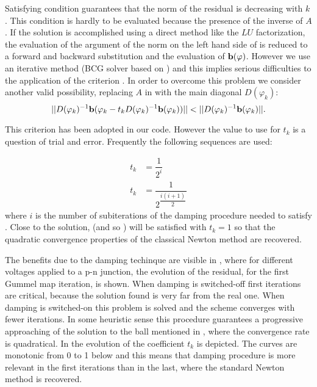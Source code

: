 Satisfying condition  guarantees that the norm of the residual is decreasing with $k$.
This condition is hardly to be evaluated because the presence of the inverse of $A$. If the solution is accomplished using a direct method like the $LU$ factorization, the evaluation of the argument of the norm on the left hand side of  is reduced to a forward and backward substitution and the evaluation of $\mathbf{b}(\varphi)$. However we use an iterative method (BCG solver based on \cite{NumericalRecipes}) and this implies serious difficulties to the application of the criterion . In order to overcome this problem we consider another valid possibility, replacing $A$ in  with  the main diagonal $D(\varphi_k)$:
\begin{equation}
\label{eq: easy criterion}
||D(\varphi_k)^{-1}\vect{b}(\varphi_k-t_kD(\varphi_k)^{-1}\vect{b}(\varphi_k))||<||D(\varphi_k)^{-1}\vect{b}(\varphi_k)||.
\end{equation}

This criterion has been adopted in our code. However the value to use for $t_k$ is a question of trial and error. Frequently the following sequences are used:

\begin{align}
t_k & = \dfrac{1}{2^i} \\
t_k & = \dfrac{1}{2^{\dfrac{i(i+1)}{2}}}  
\end{align}
where $i$ is the number of subiterations of the damping procedure needed to satisfy . Close to the solution,  (and so ) will be satisfied with $t_k=1$ so that the quadratic convergence properties of the classical Newton method are recovered.

The benefits due to the damping techinque are visible in , where for different voltages applied to a p-n junction, the evolution of the residual, for the first Gummel map iteration, is shown. When damping is switched-off first iterations are critical, because the solution found is very far from the real one. When damping is switched-on this problem is solved and the scheme converges with fewer iterations. In some heuristic sense this procedure guarantees a progressive approaching of the solution to the ball mentioned in , where the convergence rate is quadratical. In  the evolution of the coefficient $t_k$ is depicted. 
The curves are monotonic from 0 to 1 below and this means that damping procedure is more relevant in the first iterations than in the last, where the standard Newton method is recovered.

